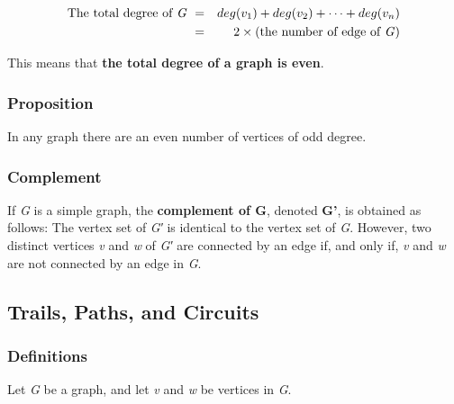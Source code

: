\documentclass{article}
\begin{document}
\begin{eqnarray}
\text{The total degree of \textit{G} } & = & deg(v_1) + deg(v_2) + \cdots + deg(v_n) \\
& = & 2 \times (\text{the number of edge of \textit{G}})
\end{eqnarray}

This means that \textbf{the total degree of a graph is even}.

\subsubsection{Proposition}
In any graph there are an even number of vertices of odd degree.

\subsubsection{Complement}
If \textit{G} is a simple graph, the \textbf{complement of G}, denoted \textbf{G'}, is obtained as follows: The vertex set of \textit{G′} is identical to the vertex set of \textit{G}. However, two distinct vertices \textit{v} and \textit{w} of \textit{G′} are connected by an edge if, and only if, \textit{v} and \textit{w} are not connected by an edge in \textit{G}.

\subsection{Trails, Paths, and Circuits}
\subsubsection{Definitions}
Let \textit{G} be a graph, and let \textit{v} and \textit{w} be vertices in \textit{G}.
\end{document}
